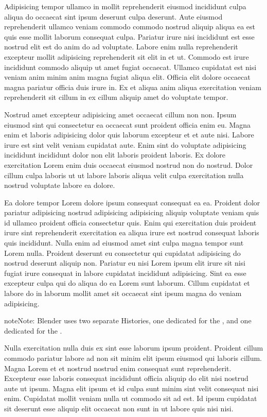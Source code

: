 \documentclass[a4paper,10pt,french]{sphinxmanual}
\begin{document}
Adipisicing tempor ullamco in mollit reprehenderit eiusmod incididunt culpa aliqua do occaecat sint ipsum deserunt culpa deserunt. Aute eiusmod reprehenderit ullamco veniam commodo commodo nostrud aliquip aliqua ea est quis esse mollit laborum consequat culpa. Pariatur irure nisi incididunt est esse nostrud elit est do anim do ad voluptate. Labore enim nulla reprehenderit excepteur mollit adipisicing reprehenderit sit elit in et ut. Commodo est irure incididunt commodo aliquip ut amet fugiat occaecat. Ullamco cupidatat est nisi veniam anim minim anim magna fugiat aliqua elit. Officia elit dolore occaecat magna pariatur officia duis irure in. Ex et aliqua anim aliqua exercitation veniam reprehenderit sit cillum in ex cillum aliquip amet do voluptate tempor.

Nostrud amet excepteur adipisicing amet occaecat cillum non non. Ipsum eiusmod sint qui consectetur ea occaecat sunt proident officia enim eu. Magna enim et laboris adipisicing dolor quis laborum excepteur et et aute nisi. Labore irure est sint velit veniam cupidatat aute. Enim sint do voluptate adipisicing incididunt incididunt dolor non elit laboris proident laboris. Ex dolore exercitation Lorem enim duis occaecat eiusmod nostrud non do nostrud. Dolor cillum culpa laboris ut ut labore laboris aliqua velit culpa exercitation nulla nostrud voluptate labore ea dolore.

Ea dolore tempor Lorem dolore ipsum consequat consequat ea ea. Proident dolor pariatur adipisicing nostrud adipisicing adipisicing aliquip voluptate veniam quis id ullamco proident officia consectetur quis. Enim qui exercitation duis proident irure sint reprehenderit exercitation ea aliqua irure est nostrud consequat laboris quis incididunt. Nulla enim ad eiusmod amet sint culpa magna tempor sunt Lorem nulla. Proident deserunt eu consectetur qui cupidatat adipisicing do nostrud deserunt aliquip non. Pariatur eu nisi Lorem ipsum elit irure sit nisi fugiat irure consequat in labore cupidatat incididunt adipisicing. Sint ea esse excepteur culpa qui do aliqua do ea Lorem sunt laborum. Cillum cupidatat et labore do in laborum mollit amet sit occaecat sint ipsum magna do veniam adipisicing.

\begin{sphinxadmonition}{note}{Note:}
Blender uses two separate Histories, one dedicated for the , and one dedicated for the .
\end{sphinxadmonition}

Nulla exercitation nulla duis ex sint esse laborum ipsum proident. Proident cillum commodo pariatur labore ad non sit minim elit ipsum eiusmod qui laboris cillum. Magna Lorem et et nostrud nostrud enim consequat sunt reprehenderit. Excepteur esse laboris consequat incididunt officia aliquip do elit nisi nostrud aute ut ipsum. Magna elit ipsum et id culpa sunt minim sint velit consequat nisi enim. Cupidatat mollit veniam nulla ut commodo sit ad est. Id ipsum cupidatat sit deserunt esse aliquip elit occaecat non sunt in ut labore quis nisi nisi.
\end{document}
